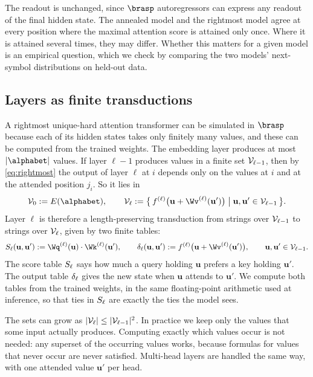 The readout is unchanged, since $\brasp$ autoregressors can express any readout of the final hidden state.
The annealed model and the rightmost model agree at every position where the maximal attention
score is attained only once. Where it is attained several times, they may differ.
Whether this matters for a given model is an empirical question, which we check by
comparing the two models' next-symbol distributions on held-out data.

\subsection{Layers as finite transductions}
\label{sec:finite_transductions}

A rightmost unique-hard attention transformer can be simulated in $\brasp$ because each of its hidden states takes only finitely many values,
and these can be computed from the trained weights.
The embedding layer produces at most $|\alphabet|$ values. If layer $\ell-1$ produces values in a finite set
$\mathcal{V}_{\ell-1}$, then by \cref{eq:rightmost} the output of layer $\ell$ at $i$ depends only on the
values at $i$ and at the attended position $j_i$. So it lies in
\[
\Vals_0 := E(\alphabet), \qquad
\Vals_\ell := \bigl\{\, f^{(\ell)}\bigl(\mathbf{u}+\Wv^{(\ell)}(\mathbf{u}')\bigr) \bigm| \mathbf{u},\mathbf{u}'\in\Vals_{\ell-1} \,\bigr\}.
\]
Layer $\ell$ is therefore a length-preserving transduction from strings over $\mathcal{V}_{\ell-1}$ to
strings over $\mathcal{V}_\ell$, given by two finite tables:
\[
\Sc_\ell(\mathbf{u},\mathbf{u}') := \Wq^{(\ell)}(\mathbf{u})\cdot\Wk^{(\ell)}(\mathbf{u}'),
\qquad
\Outtab_\ell(\mathbf{u},\mathbf{u}') := f^{(\ell)}\bigl(\mathbf{u}+\Wv^{(\ell)}(\mathbf{u}')\bigr),
\qquad \mathbf{u},\mathbf{u}'\in\Vals_{\ell-1}.
\]
The score table $S_\ell$ says how much a query holding $\mathbf{u}$ prefers a key holding
$\mathbf{u}'$. The output table $\delta_\ell$ gives the new state when $\mathbf{u}$ attends to $\mathbf{u}'$.
We compute both tables from the trained weights, in the same floating-point arithmetic used at
inference, so that ties in $S_\ell$ are exactly the ties the model sees.

The sets can grow as $|\mathcal{V}_\ell|\leq|\mathcal{V}_{\ell-1}|^2$. In practice we keep only the values that
some input actually produces. Computing exactly which values occur is not needed:
any superset of the occurring values works, because formulas for values that never occur are never satisfied.
Multi-head layers are handled the same way, with one attended value $\mathbf{u}'$ per head.

